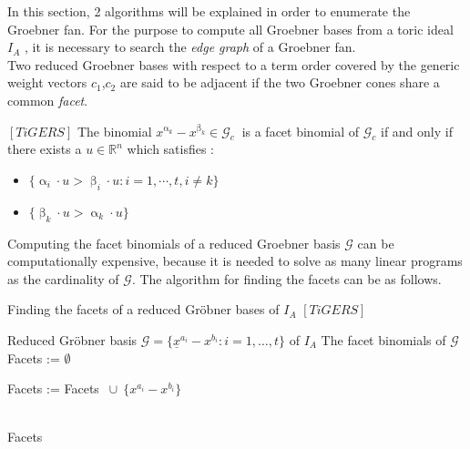 In this section, 2 algorithms will be explained in order to enumerate the Groebner fan.
For the purpose to compute all Groebner bases from a toric ideal $I_A$ , it is necessary to search the \textit{edge graph} of a Groebner fan.\\
Two reduced Groebner bases with respect to a term order covered by the generic weight vectors $c_{1}$,$c_{2}$ are said to be adjacent if the two Groebner cones share a common \textit{facet}.

\begin{env_definition}
$\left[TiGERS \right]  $ 
The binomial $x^{\upalpha_{k}}-x^{\upbeta_k} \in \mathcal{G}_c~$ is a facet binomial of $\mathcal{G}_c$ if and only if there exists a $u \in \mathbb{R}^{n}$ which satisfies :

\begin{itemize}
\item
$ \lbrace \upalpha_{i} \cdot u > \upbeta_{i} \cdot u : i = 1, \cdots , t, i \neq k \rbrace  
$
\item
$ \lbrace \upbeta_{k} \cdot u > \upalpha_{k} \cdot u \rbrace $
\end{itemize}


\end{env_definition}
Computing the facet binomials of a reduced Groebner basis $\mathcal{G}$ can be computationally expensive, because it is needed to solve as many linear programs as the cardinality of $\mathcal{G}$. The algorithm for finding the facets can be as follows.



\begin{algorithm}
\caption{Finding the facets of a reduced Gröbner bases of $I_A$ $\left[ TiGERS\right]  $}
\label{lp-alg}
\begin{algorithmic}[1]

\Require
Reduced Gröbner basis $ \mathcal{G} = \lbrace \underline{x}^{a_{i}} - {x}^{b_{i}} : i = 1,\dots,t  \rbrace $ of $I_A$
\Ensure The facet binomials of $\mathcal{G}$
\State Facets := $\emptyset$

\State Facets := Facets $~\cup~\{{x}^{a_{i}} - {x}^{b_{i}} \} $
\EndIf

\EndFor \\
\Return Facets
\end{algorithmic}
\end{algorithm}

